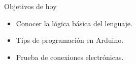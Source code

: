 \begin{frame}[t]{Objetivos de hoy}\vspace{10pt}

\begin{itemize}
	\item Conocer la l\'ogica b\'asica del lenguaje.
	\item Tips de programaci\'on en Arduino.
	\item Prueba de conexiones electr\'onicas.
\end{itemize}

\end{frame}